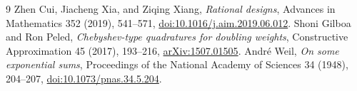 \documentclass[11pt]{article}
\begin{document}
\begin{thebibliography}{9}
 Zhen Cui, Jiacheng Xia, and Ziqing Xiang,
\emph{Rational designs}, Advances in Mathematics 352 (2019), 541--571,
\href{https://doi.org/10.1016/j.aim.2019.06.012}{doi:10.1016/j.aim.2019.06.012}.
 Shoni Gilboa and Ron Peled,
\emph{Chebyshev-type quadratures for doubling weights},
Constructive Approximation 45 (2017), 193--216,
\href{https://arxiv.org/abs/1507.01505}{arXiv:1507.01505}.
 Andr\'e Weil,
\emph{On some exponential sums}, Proceedings of the National Academy of
Sciences 34 (1948), 204--207,
\href{https://doi.org/10.1073/pnas.34.5.204}{doi:10.1073/pnas.34.5.204}.
\end{thebibliography}
\end{document}
